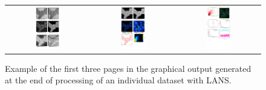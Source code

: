 \documentclass[a4paper, 11pt]{article}
\begin{document}
\begin{figure}[!ht]
\centering
\begin{tabular}{ccc}
\includegraphics[width=0.31\textwidth, valign=t]{figs3/outputG1}
&
\includegraphics[width=0.31\textwidth, valign=t]{figs3/outputG2}
&
\includegraphics[width=0.31\textwidth, valign=t]{figs3/outputG3}
\end{tabular}
\caption{\label{fig:outputG}%
Example of the first three pages in the graphical output generated at the end of processing of an individual dataset with LANS.}
\end{figure}
\end{document}
